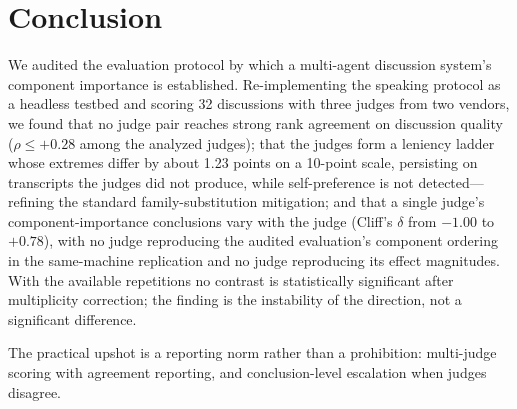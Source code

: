 \section{Conclusion}
\label{sec:conclusion}

We audited the evaluation protocol by which a multi-agent discussion
system's component importance is established. Re-implementing the
speaking protocol as a headless testbed and scoring 32 discussions with
three judges from two vendors, we found that no judge pair reaches
strong rank agreement on discussion quality ($\rho\leq+0.28$ among the
analyzed judges); that the judges form a leniency ladder whose extremes
differ by about 1.23 points on a 10-point scale, persisting on
transcripts the judges did not produce, while self-preference is not
detected---refining the standard family-substitution mitigation; and
that a single judge's component-importance conclusions vary with the
judge (Cliff's $\delta$ from $-1.00$ to $+0.78$), with no judge
reproducing the audited evaluation's component ordering in the
same-machine replication and no judge reproducing its effect
magnitudes. With the available repetitions no contrast is statistically
significant after multiplicity correction; the finding is the
instability of the direction, not a significant difference.

The practical upshot is a reporting norm rather than a prohibition:
multi-judge scoring with agreement reporting, and conclusion-level
escalation when judges disagree.

